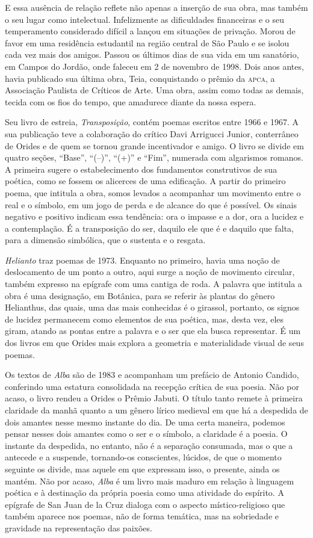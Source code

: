 \documentclass[12pt]{extarticle}
\begin{document}
E essa ausência de relação reflete não apenas a inserção de sua obra,
mas também o seu lugar como intelectual. Infelizmente as dificuldades
financeiras e o seu temperamento considerado difícil a lançou em
situações de privação. Morou de favor em uma residência estudantil na
região central de São Paulo e se isolou cada vez mais dos amigos. Passou
os últimos dias de sua vida em um sanatório, em Campos do Jordão, onde
faleceu em 2 de novembro de 1998. Dois anos antes, havia publicado sua
última obra, Teia, conquistando o prêmio da \textsc{apca}, a Associação Paulista
de Críticos de Arte. Uma obra, assim como todas as demais, tecida com os
fios do tempo, que amadurece diante da nossa espera.

Seu livro de estreia, \emph{Transposição}, contém poemas escritos entre
1966 e 1967. A sua publicação teve a colaboração do crítico Davi
Arrigucci Junior, conterrâneo de Orides e de quem se tornou grande
incentivador e amigo. O livro se divide em quatro seções, ``Base'',
``(--)'', ``(+)'' e ``Fim'', numerada com algarismos romanos. A primeira
sugere o estabelecimento dos fundamentos construtivos de sua poética,
como se fossem os alicerces de uma edificação. A partir do primeiro
poema, que intitula a obra, somos levados a acompanhar um movimento
entre o real e o símbolo, em um jogo de perda e de alcance do que é
possível. Os sinais negativo e positivo indicam essa tendência: ora o
impasse e a dor, ora a lucidez e a contemplação. É a transposição do
ser, daquilo ele que é e daquilo que falta, para a dimensão simbólica,
que o sustenta e o resgata.

\emph{Helianto} traz poemas de 1973. Enquanto no primeiro, havia uma
noção de deslocamento de um ponto a outro, aqui surge a noção de
movimento circular, também expresso na epígrafe com uma cantiga de roda.
A palavra que intitula a obra é uma designação, em Botânica, para se
referir às plantas do gênero Helianthus, das quais, uma das mais
conhecidas é o girassol, portanto, os signos de lucidez permanecem como
elementos de sua poética, mas, desta vez, eles giram, atando as pontas
entre a palavra e o ser que ela busca representar. É um dos livros em
que Orides mais explora a geometria e materialidade visual de seus
poemas.

Os textos de \emph{Alba} são de 1983 e acompanham um prefácio de Antonio
Candido, conferindo uma estatura consolidada na recepção crítica de sua
poesia. Não por acaso, o livro rendeu a Orides o Prêmio Jabuti. O título
tanto remete à primeira claridade da manhã quanto a um gênero lírico
medieval em que há a despedida de dois amantes nesse mesmo instante do
dia. De uma certa maneira, podemos pensar nesses dois amantes como o ser
e o símbolo, a claridade é a poesia. O instante da despedida, no
entanto, não é a separação consumada, mas o que a antecede e a suspende,
tornando-os conscientes, lúcidos, de que o momento seguinte os divide,
mas aquele em que expressam isso, o presente, ainda os mantém. Não por
acaso, \emph{Alba} é um livro mais maduro em relação à linguagem poética
e à destinação da própria poesia como uma atividade do espírito. A
epígrafe de San Juan de la Cruz dialoga com o aspecto místico-religioso
que também aparece nos poemas, não de forma temática, mas na sobriedade
e gravidade na representação das paixões.
\end{document}
